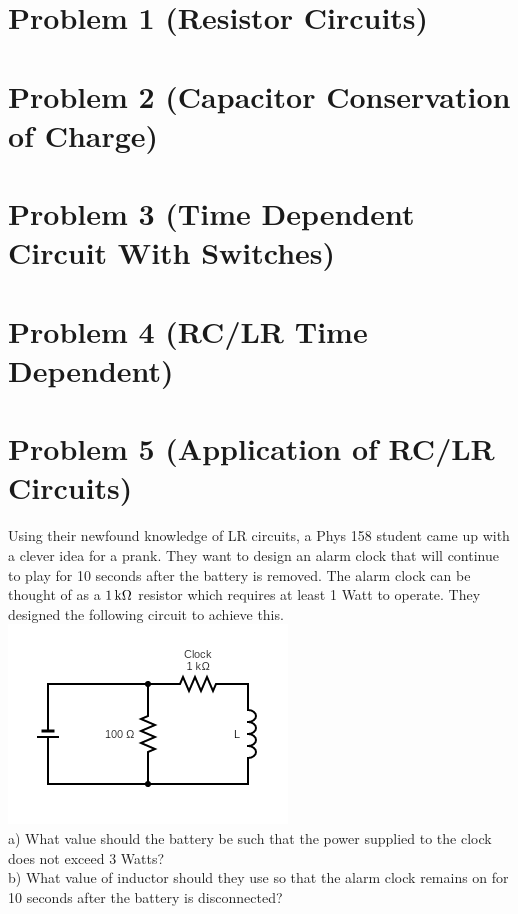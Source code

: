 \documentclass[11pt, fleqn]{article}
\begin{document}
\section*{Problem 1 (Resistor Circuits)}

\section*{Problem 2 (Capacitor Conservation of Charge)}

\section*{Problem 3 (Time Dependent Circuit With Switches)}

\section*{Problem 4 (RC/LR Time Dependent)}

\section*{Problem 5 (Application of RC/LR Circuits)}
Using their newfound knowledge of LR circuits, a Phys 158 student came up with a clever idea for a prank. They want to design an alarm clock that will continue to play for 10 seconds after the battery is removed. The alarm clock can be thought of as a $1\,\mathrm{k\Omega}$ resistor which requires at least 1 Watt to operate. They designed the following circuit to achieve this.\\
\includegraphics{Images/AlarmClockCircuit}\\
a) What value should the battery be such that the power supplied to the clock does not exceed 3 Watts?\\
b) What value of inductor should they use so that the alarm clock remains on for 10 seconds after the battery is disconnected?\\
\end{document}

